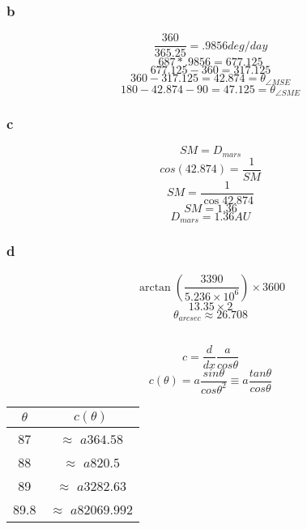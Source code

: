 \documentclass{article}
\begin{document}
\begin{center}
\end{center}


\subsubsection{b}

\[\frac{360}{365.25} = .9856 deg/day\]
\[687* .9856 = 677.125 \]
\[677.125 - 360 = 317.125\]
\[360 - 317.125 = 42.874 = \theta_{\angle MSE}\]
\[180 - 42.874 - 90 = 47.125 =  \theta_{\angle SME}\]

\subsubsection{c}
\[SM = D_{mars}\]
\[cos(42.874) = \frac{1}{SM}\]
\[SM = \frac{1}{\cos 42.874}\]
\[SM = 1.36\]
\[D_{mars} = 1.36 AU\]

\subsubsection{d}

\[\arctan(\frac{3390}{5.236 \times 10^6}) \times 3600 \]
\[ 13.35 \times 2 \]
\[\theta_{arcsec}\approx 26.708\]


\subsection{}

\[c = \frac{d}{dx} \frac{a}{cos\theta}\]
\[c(\theta) = a\frac{sin\theta}{cos\theta^2} \equiv a\frac{tan\theta}{cos\theta}\]

\begin{center}
\begin{tabular}{|c|c|}
\hline
 $\theta$ & $c(\theta)$ \\
 \hline
 87 & $\approx$ $a364.58$ \\
 88 & $\approx$ $a820.5$ \\
 89 & $\approx$ $a3282.63$ \\
 89.8 & $\approx$ $a82069.992$ \\
\hline
\end{tabular}
\end{center}
\end{document}
